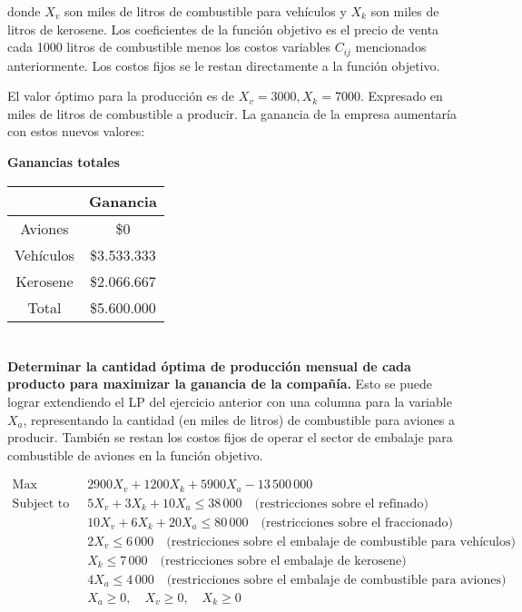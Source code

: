 \documentclass[10pt,a4paper]{article}
\begin{document}
donde $X_v$ son miles de litros de combustible para vehículos y  $X_k$ son miles de litros de kerosene. Los coeficientes de la función objetivo es el precio de venta cada 1000 litros de combustible menos los costos variables $C_{ij}$ mencionados anteriormente. Los costos fijos se le restan directamente a la función objetivo.

El valor óptimo para la producción es de $X_v = 3000, X_k = 7000$. Expresado en miles de litros de combustible a producir. La ganancia de la empresa aumentaría con estos nuevos valores:
\clearpage
\begin{center}
	\textbf{Ganancias totales}
	\vspace{3mm}

	\begin{tabular}{| c | c |}
		\hline
		&           Ganancia    \\
		\hline
		Aviones   & \$0  \\
		\hline
		Vehículos & \$3.533.333 \\
		\hline
		Kerosene  & \$2.066.667 \\
		\hline
		Total     & \$5.600.000\\
		\hline
	\end{tabular}
\end{center}

\section{} %
\textbf{Determinar la cantidad óptima de producción mensual de cada producto para maximizar la ganancia de la compañía.}
Esto se puede lograr extendiendo el LP del ejercicio anterior con una columna para la variable $X_a$, representando la cantidad (en miles de litros) de combustible para aviones a producir. También se restan los costos fijos de operar el sector de embalaje para combustible de aviones en la función objetivo.

\begin{align*}
	\text{Max} \quad & 2900 X_v + 1200 X_k + 5900 X_a  - 13\,500\,000 \\
	\text{Subject to} \quad
	& 5 X_v + 3 X_k + 10 X_a \leq 38\,000 \quad \text{(restricciones sobre el refinado)} \\
	& 10 X_v + 6 X_k + 20 X_a \leq 80\,000 \quad \text{(restricciones sobre el fraccionado)} \\
	& 2 X_v \leq 6\,000 \quad \text{(restricciones sobre el embalaje de combustible para vehículos)}\\
	& X_k \leq 7\,000 \quad \text{(restricciones sobre el embalaje de kerosene)}\\
	& 4 X_a \leq 4\,000 \quad \text{(restricciones sobre el embalaje de combustible para aviones)} \\
	& X_a \geq 0,\quad X_v \geq 0,\quad X_k \geq 0
\end{align*}
\end{document}
